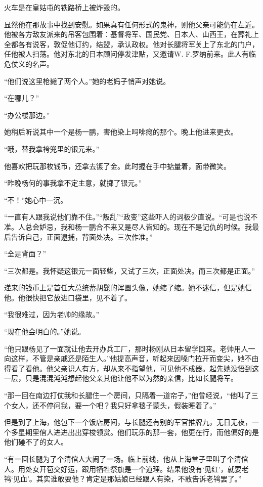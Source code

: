 \par 火车是在皇姑屯的铁路桥上被炸毁的。
\par 显然他在那故事中找到安慰。如果真有任何形式的鬼神，则他父亲可能仍在左近。他被各方敌友派来的吊客包围着：基督将军、国民党、日本人、山西王，在葬礼上全都各有说客，敦促他订约，结盟，承认政权。他对长腿将军关上了东北的门户，任他被人扫荡。他对东北的日本顾问停发津贴，又邀请W. F.罗纳前来。此人有临危仗义的名声。
\par “他们说这里枪毙了两个人。”她的老妈子悄声对她说。
\par “在哪儿？”
\par “办公楼那边。”
\par 她稍后听说其中一个是杨一鹏，害他染上吗啡瘾的那个。晚上他进来更衣。
\par “哦，替我拿袴兜里的银元来。”
\par 他喜欢把玩那枚钱币，还拿去镀了金。此时握在手中掂量着，面带微笑。
\par “昨晚杨何的事我拿不定主意，就掷了银元。”
\par “不！”她心中一沉。
\par “一直有人跟我说他们靠不住。”“叛乱”“政变”这些吓人的词极少直说。“可是也说不准。人总会妒忌，我和杨一鹏合不来又是尽人皆知的。现在不是记仇的时候。我最后告诉自己，正面逮捕，背面处决。三次作准。”
\par “全是背面？”
\par “三次都是。我怀疑这银元一面轻些，又试了三次，正面处决。而三次都是正面。”
\par 递来的钱币上是首任大总统蓄胡髭的浑圆头像，她缩了缩。她不迷信，但是她信他。他很快把它放进口袋里，见不着了。
\par “我很难过，因为老帅的缘故。”
\par “现在他会明白的。”她说。
\par “他只跟杨见了一面就让他去开办兵工厂，那时杨刚从日本留学回来。老帅用人一向这样，不管是亲戚还是陌生人。”他提高声音，听起来因嗓门拉开而变尖，她不由得看了看他。他父亲识人有方，却从来不指望他，可见他不成器。起先她没悟到这一层，只是混混沌沌想起他父亲其他让他不以为然的亲信，比如长腿将军。
\par “那一回在南边打仗我和长腿住一个房间，只隔着一道帘子，”他曾经说，“他叫了三个女人，还不停问我，要一个吧？我只好拿毯子蒙头，假装睡着了。”
\par 但是到了上海，他包下一个饭店房间，与长腿还有别的军官推牌九，无日无夜，一个多星期里倌人进进出出穿梭领赏。他们玩乐的那一套，他更在行，而他偏好的是他们碰不了的女人。
\par “有一回长腿为了个清倌人大闹了一场。临上前线，他从上海堂子里叫了个清倌人。用处女开苞交好运，跟用牺牲祭旗是一个道理。结果他没有‘见红’，就要老鸨‘见血’。其实谁敢耍他？肯定是那姑娘已经跟人有染，不敢告诉老鸨罢了。”
